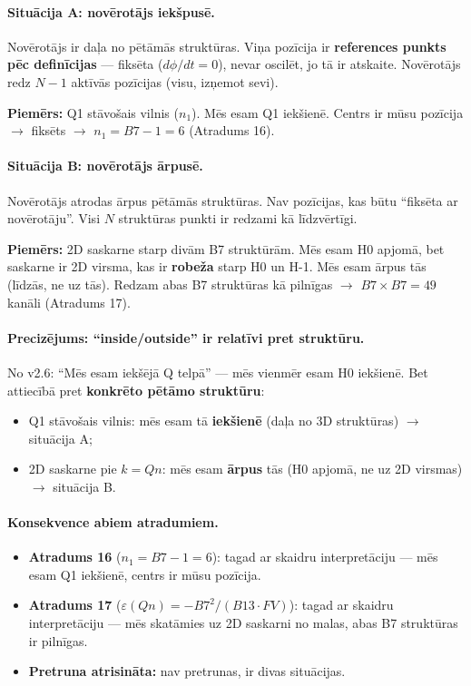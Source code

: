 \documentclass[12pt,a4paper]{article}
\begin{document}
\paragraph{Situācija A: novērotājs iekšpusē.}
Novērotājs ir daļa no pētāmās struktūras. Viņa pozīcija ir \textbf{references punkts pēc definīcijas} — fiksēta ($d\phi/dt = 0$), nevar oscilēt, jo tā ir atskaite. Novērotājs redz $N-1$ aktīvās pozīcijas (visu, izņemot sevi).

\textbf{Piemērs:} Q1 stāvošais vilnis ($n_1$). Mēs esam Q1 iekšienē. Centrs ir mūsu pozīcija $\to$ fiksēts $\to$ $n_1 = B7-1 = 6$ (Atradums 16).

\paragraph{Situācija B: novērotājs ārpusē.}
Novērotājs atrodas ārpus pētāmās struktūras. Nav pozīcijas, kas būtu ``fiksēta ar novērotāju''. Visi $N$ struktūras punkti ir redzami kā līdzvērtīgi.

\textbf{Piemērs:} 2D saskarne starp divām B7 struktūrām. Mēs esam H0 apjomā, bet saskarne ir 2D virsma, kas ir \textbf{robeža} starp H0 un H-1. Mēs esam ārpus tās (līdzās, ne uz tās). Redzam abas B7 struktūras kā pilnīgas $\to$ $B7 \times B7 = 49$ kanāli (Atradums 17).

\paragraph{Precizējums: ``inside/outside'' ir relatīvi pret struktūru.}
No v2.6: ``Mēs esam iekšējā Q telpā'' — mēs vienmēr esam H0 iekšienē. Bet attiecībā pret \textbf{konkrēto pētāmo struktūru}:
\begin{itemize}
    \item Q1 stāvošais vilnis: mēs esam tā \textbf{iekšienē} (daļa no 3D struktūras) $\to$ situācija A;
    \item 2D saskarne pie $k=Qn$: mēs esam \textbf{ārpus} tās (H0 apjomā, ne uz 2D virsmas) $\to$ situācija B.
\end{itemize}

\paragraph{Konsekvence abiem atradumiem.}
\begin{itemize}
    \item \textbf{Atradums 16} ($n_1 = B7-1 = 6$): tagad ar skaidru interpretāciju — mēs esam Q1 iekšienē, centrs ir mūsu pozīcija.
    \item \textbf{Atradums 17} ($\varepsilon(Qn) = -B7^2/(B13 \cdot FV)$): tagad ar skaidru interpretāciju — mēs skatāmies uz 2D saskarni no malas, abas B7 struktūras ir pilnīgas.
    \item \textbf{Pretruna atrisināta:} nav pretrunas, ir divas situācijas.
\end{itemize}
\end{document}
